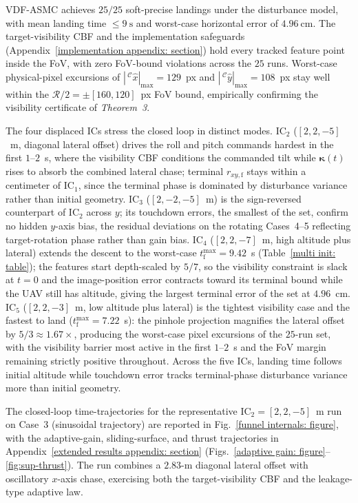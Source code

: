\documentclass{IEEEtaes}
\begin{document}
VDF-ASMC achieves $25/25$ soft-precise landings under the disturbance model, with mean landing time $\le 9~\text{s}$ and worst-case horizontal error of $4.96~\text{cm}$. The target-visibility CBF and the implementation safeguards (Appendix~\ref{implementation appendix: section}) hold every tracked feature point inside the FoV, with zero FoV-bound violations across the $25$ runs. Worst-case physical-pixel excursions of $|\,^\mathcal{C}\hat{x}|_{\max}=129$~px and $|\,^\mathcal{C}\hat{y}|_{\max}=108$~px stay well within the $\mathcal{R}/2=\pm[160,120]$~px FoV bound, empirically confirming the visibility certificate of \textit{Theorem~3}.

The four displaced ICs stress the closed loop in distinct modes. IC$_2$ ($[2,2,-5]$~m, diagonal lateral offset) drives the roll and pitch commands hardest in the first $1$--$2$~s, where the visibility CBF conditions the commanded tilt while $\boldsymbol{\kappa}(t)$ rises to absorb the combined lateral chase; terminal $r_{xy,\text{f}}$ stays within a centimeter of IC$_1$, since the terminal phase is dominated by disturbance variance rather than initial geometry. IC$_3$ ($[2,-2,-5]$~m) is the sign-reversed counterpart of IC$_2$ across $y$; its touchdown errors, the smallest of the set, confirm no hidden $y$-axis bias, the residual deviations on the rotating Cases~4--5 reflecting target-rotation phase rather than gain bias. IC$_4$ ($[2,2,-7]$~m, high altitude plus lateral) extends the descent to the worst-case $t_\text{f}^{\max}=9.42$~s (Table~\ref{multi init: table}); the features start depth-scaled by $5/7$, so the visibility constraint is slack at $t=0$ and the image-position error contracts toward its terminal bound while the UAV still has altitude, giving the largest terminal error of the set at $4.96$~cm. IC$_5$ ($[2,2,-3]$~m, low altitude plus lateral) is the tightest visibility case and the fastest to land ($t_\text{f}^{\max}=7.22$~s): the pinhole projection magnifies the lateral offset by $5/3\approx 1.67\times$, producing the worst-case pixel excursions of the $25$-run set, with the visibility barrier most active in the first $1$--$2$~s and the FoV margin remaining strictly positive throughout. Across the five ICs, landing time follows initial altitude while touchdown error tracks terminal-phase disturbance variance more than initial geometry.

The closed-loop time-trajectories for the representative IC$_2=[2,2,-5]$~m run on Case~3 (sinusoidal trajectory) are reported in Fig.~\ref{funnel internals: figure}, with the adaptive-gain, sliding-surface, and thrust trajectories in Appendix~\ref{extended results appendix: section} (Figs.~\ref{adaptive gain: figure}--\ref{fig:sup-thrust}). The run combines a $2.83$-m diagonal lateral offset with oscillatory $x$-axis chase, exercising both the target-visibility CBF and the leakage-type adaptive law.
\end{document}
